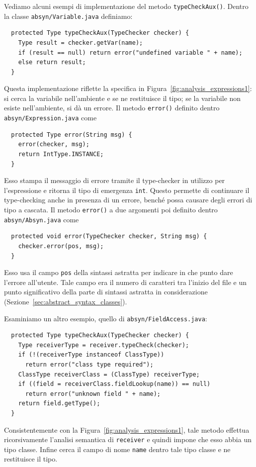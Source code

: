 Vediamo alcuni esempi di implementazione del metodo \texttt{typeCheckAux()}.
Dentro la classe \texttt{absyn/Variable.java} definiamo:
%
\begin{verbatim}
  protected Type typeCheckAux(TypeChecker checker) {
    Type result = checker.getVar(name);
    if (result == null) return error("undefined variable " + name);
    else return result;
  }
\end{verbatim}
%
Questa implementazione riflette la specifica in
Figura~\ref{fig:analysis_expressions1}: si cerca la variabile
nell'ambiente e se ne restituisce il tipo; se la variabile non
esiste nell'ambiente, si d\`a un errore.
Il metodo \texttt{error()} \e definito dentro
\texttt{absyn/Expression.java} come
%
\begin{verbatim}
  protected Type error(String msg) {
    error(checker, msg);
    return IntType.INSTANCE;
  }
\end{verbatim}
%
Esso stampa il messaggio di errore tramite il type-checker
in utilizzo per l'espressione e ritorna il tipo di emergenza \texttt{int}.
Questo permette di continuare il type-checking anche in presenza di un
errore, bench\'e possa causare degli errori di tipo a cascata.
Il metodo \texttt{error()} a due argomenti \e poi definito dentro
\texttt{absyn/Absyn.java} come
%
\begin{verbatim}
  protected void error(TypeChecker checker, String msg) {
    checker.error(pos, msg);
  }
\end{verbatim}
%
Esso usa il campo \texttt{pos} della sintassi astratta per indicare in che
punto dare l'errore all'utente. Tale campo era il numero di caratteri
tra l'inizio del file e un punto significativo della parte di sintassi
astratta in considerazione (Sezione~\ref{sec:abstract_syntax_classes}).

Esaminiamo un altro esempio, quello di \texttt{absyn/FieldAccess.java}:
%
\begin{verbatim}
  protected Type typeCheckAux(TypeChecker checker) {
    Type receiverType = receiver.typeCheck(checker);
    if (!(receiverType instanceof ClassType))
      return error("class type required");
    ClassType receiverClass = (ClassType) receiverType;
    if ((field = receiverClass.fieldLookup(name)) == null)
      return error("unknown field " + name);
    return field.getType();
  }
\end{verbatim}
%
Consistentemente con la Figura~\ref{fig:analysis_expressions1},
tale metodo effettua ricorsivamente l'analisi semantica di
\texttt{receiver} e quindi impone che esso abbia un tipo classe.
Infine cerca il campo di nome \texttt{name} dentro tale tipo classe
e ne restituisce il tipo.

